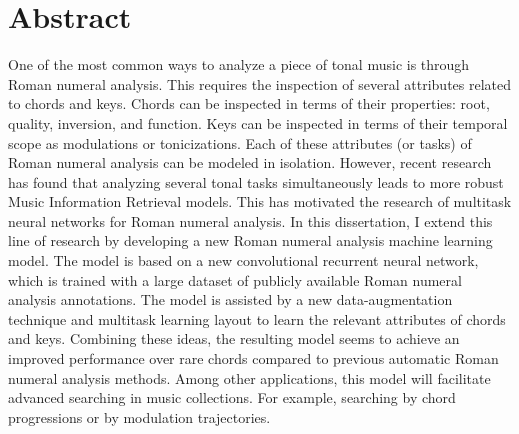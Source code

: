 \chapter*{Abstract}
\label{chap:abstract-en}

One of the most common ways to analyze a piece of tonal
music is through Roman numeral analysis. This requires the
inspection of several attributes related to chords and keys.
Chords can be inspected in terms of their properties: root,
quality, inversion, and function. Keys can be inspected in
terms of their temporal scope as modulations or
tonicizations. Each of these attributes (or tasks) of Roman
numeral analysis can be modeled in isolation. However,
recent research has found that analyzing several tonal tasks
simultaneously leads to more robust Music Information
Retrieval models. This has motivated the research of
multitask neural networks for Roman numeral analysis.
In this dissertation, I extend this line of research by
developing a new Roman numeral analysis machine learning
model. The model is based on a new convolutional recurrent
neural network, which is trained with a large dataset of
publicly available Roman numeral analysis annotations. The
model is assisted by a new data-augmentation technique and
multitask learning layout to learn the relevant attributes
of chords and keys. Combining these ideas, the resulting
model seems to achieve an improved performance over rare
chords compared to previous automatic Roman numeral analysis
methods. Among other applications, this model will
facilitate advanced searching in music collections. For
example, searching by chord progressions or by modulation
trajectories.
